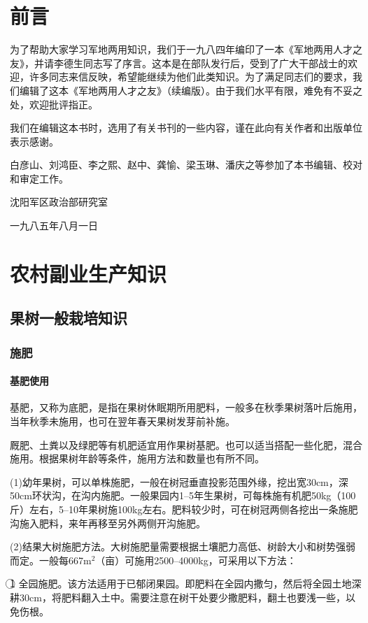 \documentclass{ctexbook}
\begin{document}
\chapter*{前言}
为了帮助大家学习军地两用知识，我们于一九八四年编印了一本《军地两用人才之友》，并请李德生同志写了序言。这本是在部队发行后，受到了广大干部战士的欢迎，许多同志来信反映，希望能继续为他们此类知识。为了满足同志们的要求，我们编辑了这本《军地两用人才之友》（续编版）。由于我们水平有限，难免有不妥之处，欢迎批评指正。

我们在编辑这本书时，选用了有关书刊的一些内容，谨在此向有关作者和出版单位表示感谢。

白彦山、刘鸿臣、李之熙、赵中、龚愉、梁玉琳、潘庆之等参加了本书编辑、校对和审定工作。
\begin{flushright}
	沈阳军区政治部研究室
\end{flushright}
\begin{flushright}
	一九八五年八月一日
\end{flushright}
\chapter{农村副业生产知识}
\section{果树一般栽培知识}
\subsection{施肥}
\subsubsection{基肥使用}
基肥，又称为底肥，是指在果树休眠期所用肥料，一般多在秋季果树落叶后施用，当年秋季未施用，也可在翌年春天果树发芽前补施。

厩肥、土粪以及绿肥等有机肥适宜用作果树基肥。也可以适当搭配一些化肥，混合施用。根据果树年龄等条件，施用方法和数量也有所不同。

(1)幼年果树，可以单株施肥，一般在树冠垂直投影范围外缘，挖出宽30cm，深50cm环状沟，在沟内施肥。一般果园内1--5年生果树，可每株施有机肥50kg（100斤）左右，5--10年果树施100kg左右。肥料较少时，可在树冠两侧各挖出一条施肥沟施入肥料，来年再移至另外两侧开沟施肥。

(2)结果大树施肥方法。大树施肥量需要根据土壤肥力高低、树龄大小和树势强弱而定。一般每667m$^{2}$（亩）可施用2500--4000kg，可采用以下方法：

\textcircled{1} 全园施肥。该方法适用于已郁闭果园。即肥料在全园内撒匀，然后将全园土地深耕30cm，将肥料翻入土中。需要注意在树干处要少撒肥料，翻土也要浅一些，以免伤根。
\end{document}
